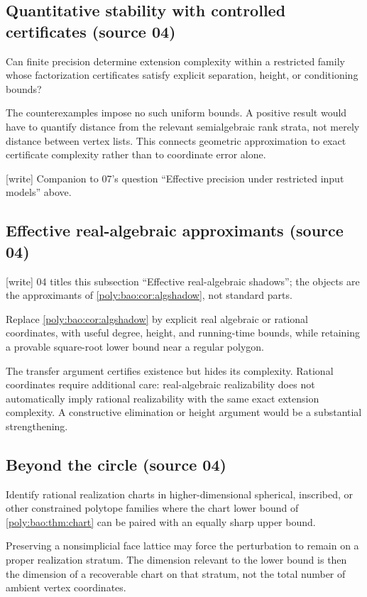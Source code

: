 \documentclass[11pt,a4paper]{article}
\numberwithin{equation}{section}
\theoremstyle{plain}
\newcommand{\wtag}{\textup{[write]}}%
\begin{document}
\subsection{Quantitative stability with controlled certificates (source 04)}
\begin{question}
Can finite precision determine extension complexity within a restricted
family whose factorization certificates satisfy explicit separation,
height, or conditioning bounds?
\end{question}
The counterexamples impose no such uniform bounds. A positive result
would have to quantify distance from the relevant semialgebraic
rank strata, not merely distance between vertex lists. This connects
geometric approximation to exact certificate complexity rather than to
coordinate error alone.

\wtag{} Companion to 07's question ``Effective precision under restricted
input models'' above.

\subsection{Effective real-algebraic approximants (source 04)}
\wtag{} 04 titles this subsection ``Effective real-algebraic shadows''; the
objects are the approximants of \cref{poly:bao:cor:algshadow}, not standard
parts.
\begin{question}
Replace \cref{poly:bao:cor:algshadow} by explicit real algebraic or rational
coordinates, with useful degree, height, and running-time bounds, while
retaining a provable square-root lower bound near a regular polygon.
\end{question}
The transfer argument certifies existence but hides its complexity.
Rational coordinates require additional care: real-algebraic
realizability does not automatically imply rational realizability with
the same exact extension complexity. A constructive elimination or
height argument would be a substantial strengthening.

\subsection{Beyond the circle (source 04)}
\begin{question}
Identify rational realization charts in higher-dimensional spherical,
inscribed, or other constrained polytope families where the chart lower
bound of \cref{poly:bao:thm:chart} can be paired with an equally sharp upper bound.
\end{question}
Preserving a nonsimplicial face lattice may force the perturbation to
remain on a proper realization stratum. The dimension relevant to the
lower bound is then the dimension of a recoverable chart on that stratum,
not the total number of ambient vertex coordinates.
\end{document}
